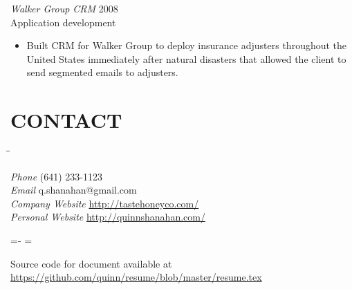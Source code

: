 \documentclass[line,margin]{res}
\begin{document}
\begin{resume}
\begin{itemize}
    \end{itemize}

    \begin{samepage}
    {\sl Walker Group CRM}
    \hfill 2008 \\
    Application development
    \begin{itemize} \itemsep -2pt
        \item
            Built CRM for Walker Group to deploy insurance adjusters
            throughout the United States immediately after natural disasters
            that allowed the client to send segmented emails to adjusters.

    \end{itemize}
    \end{samepage}

\section{CONTACT}
    \vspace{-2.3ex}
    \begin{tabbing}
    \hspace{1.5in}\= \hspace{2.0in}\= \kill

    {\sl Phone}            \> (641) 233-1123 \\
    {\sl Email}            \> q.shanahan@gmail.com \\
    {\sl Company Website}  \> \url{http://tastehoneyco.com/} \\
    {\sl Personal Website} \> \url{http://quinnshanahan.com/} \\

    \end{tabbing}

\vfill
\leftskip=-\hoffset
\advance\textwidth\hoffset
\hsize=\textwidth
\fullline
\vskip 2pt

Source code for document available at
\url{https://github.com/quinn/resume/blob/master/resume.tex}

\end{resume}
\end{document}
